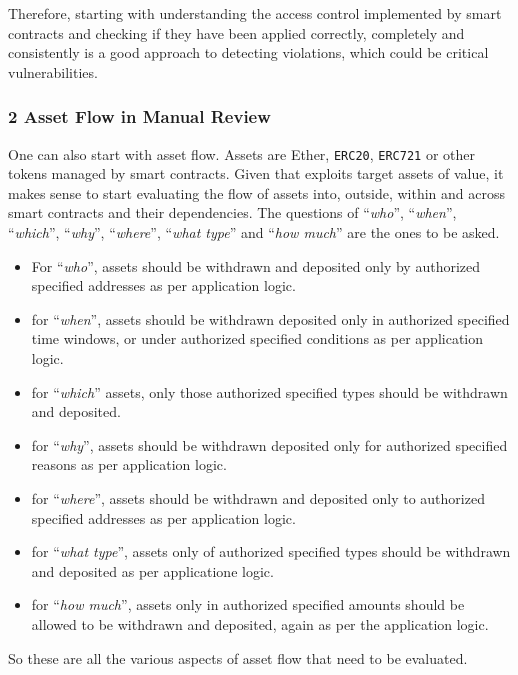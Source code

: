 Therefore, starting with understanding the access control implemented by
smart contracts and checking if they have been applied correctly,
completely and consistently is a good approach to detecting violations,
which could be critical vulnerabilities.

\subsubsection{2 Asset Flow in Manual
Review}\label{asset-flow-in-manual-review}

One can also start with asset flow. Assets are Ether, \texttt{ERC20},
\texttt{ERC721} or other tokens managed by smart contracts. Given that
exploits target assets of value, it makes sense to start evaluating the
flow of assets into, outside, within and across smart contracts and
their dependencies. The questions of ``\emph{who}'', ``\emph{when}'',
``\emph{which}'', ``\emph{why}'', ``\emph{where}'', ``\emph{what type}''
and ``\emph{how much}'' are the ones to be asked.

\begin{itemize}
\item
  For ``\emph{who}'', assets should be withdrawn and deposited only by
  authorized specified addresses as per application logic.
\item
  for ``\emph{when}'', assets should be withdrawn deposited only in
  authorized specified time windows, or under authorized specified
  conditions as per application logic.
\item
  for ``\emph{which}'' assets, only those authorized specified types
  should be withdrawn and deposited.
\item
  for ``\emph{why}'', assets should be withdrawn deposited only for
  authorized specified reasons as per application logic.
\item
  for ``\emph{where}'', assets should be withdrawn and deposited only to
  authorized specified addresses as per application logic.
\item
  for ``\emph{what type}'', assets only of authorized specified types
  should be withdrawn and deposited as per applicatione logic.
\item
  for ``\emph{how much}'', assets only in authorized specified amounts
  should be allowed to be withdrawn and deposited, again as per the
  application logic.
\end{itemize}

So these are all the various aspects of asset flow that need to be
evaluated.

